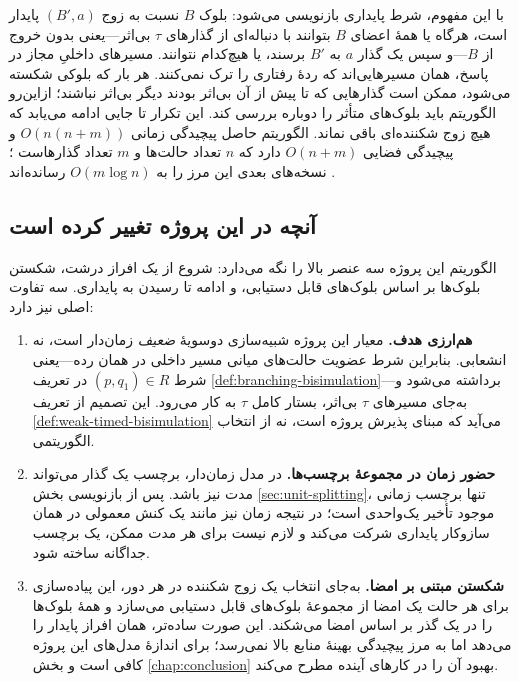 با این مفهوم، شرط پایداری بازنویسی می‌شود: بلوک $B$ نسبت به زوج $(B',a)$ پایدار است، هرگاه یا همهٔ اعضای $B$ بتوانند با دنباله‌ای از گذارهای $\tau$ بی‌اثر—یعنی بدون خروج از $B$—و سپس یک گذار $a$ به $B'$ برسند، یا هیچ‌کدام نتوانند. مسیرهای داخلیِ مجاز در پاسخ، همان مسیرهایی‌اند که ردهٔ رفتاری را ترک نمی‌کنند. هر بار که بلوکی شکسته می‌شود، ممکن است گذارهایی که تا پیش از آن بی‌اثر بودند دیگر بی‌اثر نباشند؛ ازاین‌رو الگوریتم باید بلوک‌های متأثر را دوباره بررسی کند. این تکرار تا جایی ادامه می‌یابد که هیچ زوج شکننده‌ای باقی نماند. الگوریتم حاصل پیچیدگی زمانی $O(n(n+m))$ و پیچیدگی فضایی $O(n+m)$ دارد که $n$ تعداد حالت‌ها و $m$ تعداد گذارهاست \cite{GrooteVaandrager1990}؛ نسخه‌های بعدی این مرز را به $O(m\log n)$ رسانده‌اند \cite{GrooteEtAl2017}.

\subsection{آنچه در این پروژه تغییر کرده است}

الگوریتم این پروژه سه عنصر بالا را نگه می‌دارد: شروع از یک افراز درشت، شکستن بلوک‌ها بر اساس بلوک‌های قابل دستیابی، و ادامه تا رسیدن به پایداری. سه تفاوت اصلی نیز دارد:

\begin{enumerate}
\item \textbf{هم‌ارزی هدف.} معیار این پروژه شبیه‌سازی دوسویهٔ \emph{ضعیف} زمان‌دار است، نه انشعابی. بنابراین شرط عضویت حالت‌های میانی مسیر داخلی در همان رده—یعنی شرط $(p,q_1)\in R$ در تعریف \ref{def:branching-bisimulation}—برداشته می‌شود و به‌جای مسیرهای $\tau$ بی‌اثر، بستار کامل $\tau$ به کار می‌رود. این تصمیم از تعریف \ref{def:weak-timed-bisimulation} می‌آید که مبنای پذیرش پروژه است، نه از انتخاب الگوریتمی.
\item \textbf{حضور زمان در مجموعهٔ برچسب‌ها.} در مدل زمان‌دار، برچسب یک گذار می‌تواند مدت نیز باشد. پس از بازنویسی بخش \ref{sec:unit-splitting}، تنها برچسب زمانی موجود تأخیر یک‌واحدی است؛ در نتیجه زمان نیز مانند یک کنش معمولی در همان سازوکار پایداری شرکت می‌کند و لازم نیست برای هر مدت ممکن، یک برچسب جداگانه ساخته شود.
\item \textbf{شکستن مبتنی بر امضا.} به‌جای انتخاب یک زوج شکننده در هر دور، این پیاده‌سازی برای هر حالت یک امضا از مجموعهٔ بلوک‌های قابل دستیابی می‌سازد و همهٔ بلوک‌ها را در یک گذر بر اساس امضا می‌شکند. این صورت ساده‌تر، همان افراز پایدار را می‌دهد اما به مرز پیچیدگی بهینهٔ منابع بالا نمی‌رسد؛ برای اندازهٔ مدل‌های این پروژه کافی است و بخش \ref{chap:conclusion} بهبود آن را در کارهای آینده مطرح می‌کند.
\end{enumerate}


